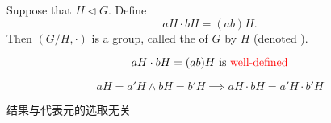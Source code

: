 \begin{frame}
  \begin{definition}
    Suppose that $H \triangleleft G$.
    Define
    \[
      aH \cdot bH = (ab)H.
    \]
    Then $(G/H, \cdot)$ is a group, called the  of $G$ by $H$
    (denoted ).
  \end{definition}
\end{frame}

\begin{frame}
  \[
    aH \cdot bH = (ab)H \text{ is \textcolor{red}{well-defined}}
  \]

  \pause
  \[
    aH = a'H \land bH = b'H \implies aH \cdot bH = a'H \cdot b'H
  \]
  \begin{center}
    结果与代表元的选取无关
  \end{center}
\end{frame}
